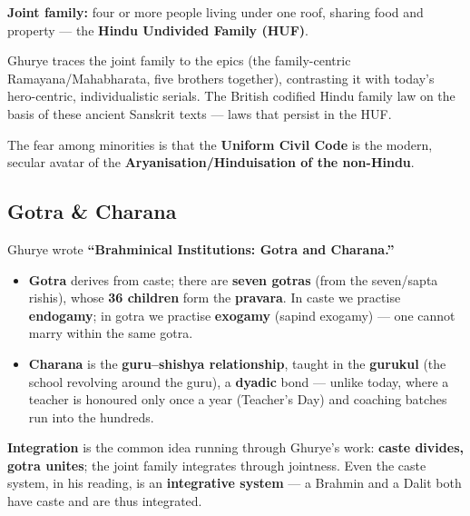\begin{KeyConcept}
\textbf{Joint family:} four or more people living under one roof, sharing food and property --- the \textbf{Hindu Undivided Family (HUF)}.
\end{KeyConcept}

Ghurye traces the joint family to the epics (the family-centric Ramayana/Mahabharata, five brothers together), contrasting it with today's hero-centric, individualistic serials. The British codified Hindu family law on the basis of these ancient Sanskrit texts --- laws that persist in the HUF.

\begin{CriticalPoint}
The fear among minorities is that the \textbf{Uniform Civil Code} is the modern, secular avatar of the \textbf{Aryanisation/Hinduisation of the non-Hindu}.
\end{CriticalPoint}

\subsection{Gotra \& Charana}

Ghurye wrote \textbf{``Brahminical Institutions: Gotra and Charana.''}

\begin{KeyConcept}
\begin{itemize}
\item \textbf{Gotra} derives from caste; there are \textbf{seven gotras} (from the seven/sapta rishis), whose \textbf{36 children} form the \textbf{pravara}. In caste we practise \textbf{endogamy}; in gotra we practise \textbf{exogamy} (sapind exogamy) --- one cannot marry within the same gotra.
\item \textbf{Charana} is the \textbf{guru--shishya relationship}, taught in the \textbf{gurukul} (the school revolving around the guru), a \textbf{dyadic} bond --- unlike today, where a teacher is honoured only once a year (Teacher's Day) and coaching batches run into the hundreds.
\end{itemize}
\end{KeyConcept}

\begin{KeyConcept}
\textbf{Integration} is the common idea running through Ghurye's work: \textbf{caste divides, gotra unites}; the joint family integrates through jointness. Even the caste system, in his reading, is an \textbf{integrative system} --- a Brahmin and a Dalit both have caste and are thus integrated.
\end{KeyConcept}

